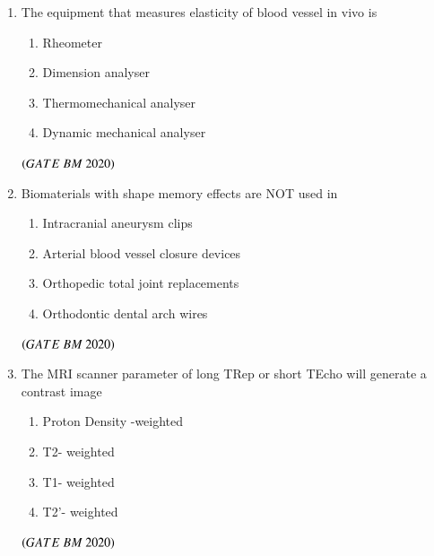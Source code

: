 \documentclass[journal,12pt,onecolumn]{IEEEtran}
\theoremstyle{remark}
\begin{document}
\begin{enumerate}
\item The equipment that measures elasticity of blood vessel in vivo is
\begin{enumerate}[label=\alph*)]
\item\hspace{0.5cm}Rheometer
\item\hspace{0.5cm}Dimension analyser
\item\hspace{0.5cm}Thermomechanical analyser
\item\hspace{0.5cm}Dynamic mechanical analyser
\end{enumerate}
 \hfill $\brak{GATE\ BM\ 2020}$\\
 
\item Biomaterials with shape memory effects are NOT used in
\begin{enumerate}[label=\alph*)] 
\item\hspace{0.5cm}Intracranial aneurysm clips
\item\hspace{0.5cm}Arterial blood vessel closure devices
\item\hspace{0.5cm}Orthopedic total joint replacements
\item\hspace{0.5cm}Orthodontic dental arch wires
\end{enumerate}
 \hfill $\brak{GATE\ BM\ 2020}$\\
 
\item The MRI scanner parameter of long TRep or short TEcho will generate a\underline{\hspace{2cm}} contrast image
\begin{enumerate}[label=\alph*)] 
\item\hspace{0.5cm}Proton Density -weighted
\item\hspace{0.5cm}T2- weighted
\item\hspace{0.5cm}T1- weighted
\item\hspace{0.5cm}T2'- weighted
\end{enumerate}
 \hfill $\brak{GATE\ BM\ 2020}$\\


\end{enumerate}
\end{document}
